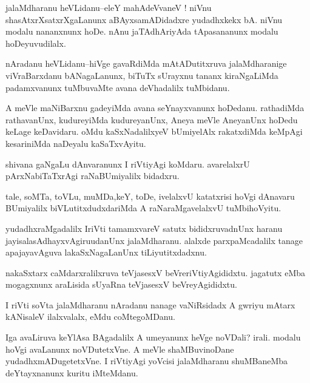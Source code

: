 \documentclass{article}
\begin{document}
\begin{mn}%
jalaMdharanu heVLidanu--eleY mahAdeVvaneV ! niVnu shasAtxrXsatxrXgaLanunx aBAyxsamADidadxre 
yudadhxkekx bA. niVnu modalu nananxnunx hoDe. nAnu jaTAdhAriyAda tApasananunx modalu 
hoDeyuvudilalx.
\end{mn}

\begin{mn}%
nAradanu heVLidanu--hiVge gavaRdiMda mAtADutitxruva jalaMdharanige viVraBarxdanu 
bANagaLanunx, biTuTx sUrayxnu tananx kiraNgaLiMda padamxvanunx tuMbuvaMte avana deVhadalilx 
tuMbidanu.
\end{mn}

\begin{mn}%
A meVle maNiBarxnu gadeyiMda avana seYnayxvanunx hoDedanu. rathadiMda rathavanUnx, 
kudureyiMda kudureyanUnx, Aneya meVle AneyanUnx hoDedu keLage keDavidaru. oMdu 
kaSxNadalilxyeV bUmiyelAlx rakatxdiMda keMpAgi kesariniMda naDeyalu kaSaTxvAyitu.
\end{mn}

\begin{mn}%
shivana gaNgaLu dAnvaranunx I riVtiyAgi koMdaru. avarelalxrU pArxNabiTaTxrAgi raNaBUmiyalilx 
bidadxru.
\end{mn}

\begin{mn}%
tale, soMTa, toVLu, muMDa,keY, toDe, ivelalxvU katatxrisi hoVgi dAnavaru BUmiyalilx 
biVLutitxdudxdariMda A raNaraMgavelalxvU tuMbihoVyitu.
\end{mn}

\begin{mn}%
yudadhxraMgadalilx IriVti tamamxvareV satutx bididxruvadnUnx haranu 
jayisalasAdhayxvAgiruudanUnx jalaMdharanu. alalxde parxpaMcadalilx tanage apajayavAguva 
lakaSxNagaLanUnx tiLiyutitxdadxnu.
\end{mn}

\begin{mn}%
nakaSxtarx caMdarxralilxruva teVjasesxV beVreriVtiyAgididxtu. jagatutx eMba mogagxnunx 
araLisida sUyaRna teVjasesxV beVreyAgididxtu.
\end{mn}

\begin{mn}%
I riVti soVta jalaMdharanu nAradanu nanage vaNiRsidadx A gwriyu mAtarx kANisaleV 
ilalxvalalx, eMdu coMtegoMDanu.
\end{mn}

\begin{mn}%
Iga avaLiruva keYlAsa BAgadalilx A umeyanunx heVge noVDali? irali. modalu hoVgi avaLanunx 
noVDutetxVne. A meVle shaMBuvinoDane yudadhxmADugetetxVne. I riVtiyAgi yoVcisi jalaMdharanu 
shuMBaneMba deYtayxnanunx kuritu iMteMdanu.
\end{mn}
\end{document}
